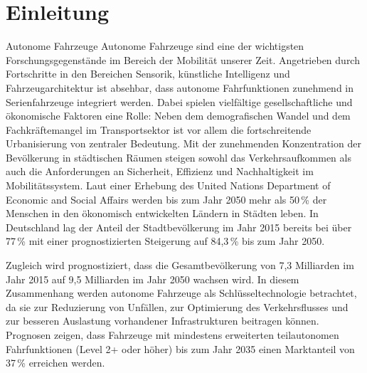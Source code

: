 \chapter{Einleitung}

Autonome Fahrzeuge Autonome Fahrzeuge sind eine der wichtigsten Forschungsgegenstände im Bereich der Mobilität unserer Zeit. Angetrieben durch Fortschritte in den Bereichen Sensorik, künstliche Intelligenz und Fahrzeugarchitektur ist absehbar, dass autonome Fahrfunktionen zunehmend in Serienfahrzeuge integriert werden. Dabei spielen vielfältige gesellschaftliche und ökonomische Faktoren eine Rolle: Neben dem demografischen Wandel und dem Fachkräftemangel im Transportsektor ist vor allem die fortschreitende Urbanisierung von zentraler Bedeutung. Mit der zunehmenden Konzentration der Bevölkerung in städtischen Räumen steigen sowohl das Verkehrsaufkommen als auch die Anforderungen an Sicherheit, Effizienz und Nachhaltigkeit im Mobilitätssystem. Laut einer Erhebung des United Nations Department of Economic and Social Affairs \cite{bpb2017} werden bis zum Jahr 2050 mehr als 50\,\% der Menschen in den ökonomisch entwickelten Ländern in Städten leben. In Deutschland lag der Anteil der Stadtbevölkerung im Jahr 2015 bereits bei über 77\,\% mit einer prognostizierten Steigerung auf 84,3\,\% bis zum Jahr 2050. \cite{Statista2025}

\begin{center}
\end{center}

Zugleich wird prognostiziert, dass die Gesamtbevölkerung von 7,3 Milliarden im Jahr 2015 auf 9,5 Milliarden im Jahr 2050 wachsen wird. In diesem Zusammenhang werden autonome Fahrzeuge als Schlüsseltechnologie betrachtet, da sie zur Reduzierung von Unfällen, zur Optimierung des Verkehrsflusses und zur besseren Auslastung vorhandener Infrastrukturen beitragen können. Prognosen zeigen, dass Fahrzeuge mit mindestens erweiterten teilautonomen Fahrfunktionen (Level 2+ oder höher) bis zum Jahr 2035 einen Marktanteil von 37\,\% erreichen werden.

